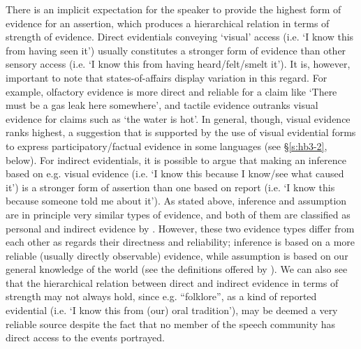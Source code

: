 \documentclass[output=paper]{langsci/langscibook}
\begin{document}
There is an implicit expectation for the speaker to provide the highest form of evidence for an assertion, which produces a hierarchical relation in terms of strength of evidence. Direct evidentials conveying ‘visual’ access (i.e. ‘I know this from having seen it’) usually constitutes a stronger form of evidence than other sensory access (i.e. ‘I know this from having heard/felt/smelt it’). It is, however, important to note that states-of-affairs display variation in this regard. For example, olfactory evidence is more direct and reliable for a claim like ‘There must be a gas leak here somewhere’, and tactile evidence outranks visual evidence for claims such as ‘the water is hot’. In general, though, visual evidence ranks highest, a suggestion that is supported by the use of visual evidential forms to express participatory/factual evidence in some languages (see §\ref{s:hb3-2}, below). For indirect evidentials, it is possible to argue that making an inference based on e.g. visual evidence (i.e. ‘I know this because I know/see what caused it’) is a stronger form of assertion than one based on report (i.e. ‘I know this because someone told me about it’). As stated above, inference and assumption are in principle very similar types of evidence, and both of them are classified as personal and indirect evidence by \cite[37]{Plungian2010}. 
However, these two evidence types differ from each other as regards their directness and reliability; inference is based on a more reliable (usually directly observable) evidence, while assumption is based on our general knowledge of the world (see the definitions offered by \cite[37]{Plungian2010}). We can also see that the hierarchical relation between direct and indirect evidence in terms of strength may not always hold, since e.g. “folklore”, as a kind of reported evidential (i.e. ‘I know this from (our) oral tradition’), may be deemed a very reliable source despite the fact that no member of the speech community has direct access to the events portrayed. 
\end{document}

